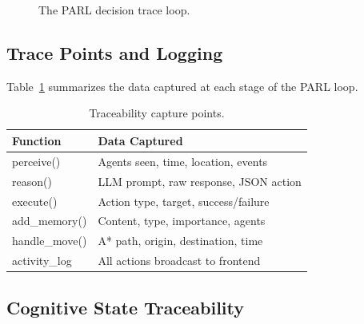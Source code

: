 \documentclass[conference]{IEEEtran}
\begin{document}
\begin{figure}[ht]
\centering
{}
\caption{The PARL decision trace loop.}
\label{fig:parl}
\end{figure}

\subsection{Trace Points and Logging}

Table~\ref{tab:trace} summarizes the data captured at each stage of the PARL loop.

\begin{table}[ht]
\centering
\caption{Traceability capture points.}
\label{tab:trace}
\scriptsize
\begin{tabular}{@{}lp{4.8cm}@{}}
\toprule
\textbf{Function} & \textbf{Data Captured} \\
\midrule
perceive()     & Agents seen, time, location, events \\
reason()       & LLM prompt, raw response, JSON action \\
execute()      & Action type, target, success/failure \\
add\_memory()   & Content, type, importance, agents \\
handle\_move()  & A* path, origin, destination, time \\
activity\_log   & All actions broadcast to frontend \\
\bottomrule
\end{tabular}
\end{table}

\subsection{Cognitive State Traceability}
\end{document}
